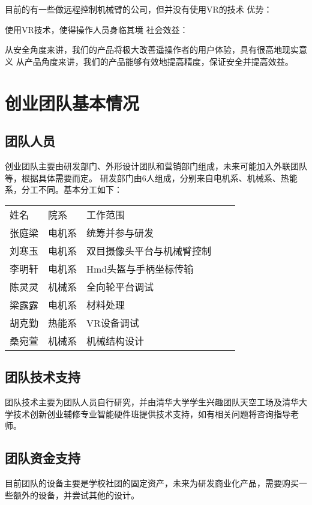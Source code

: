 目前的有一些做远程控制机械臂的公司，但并没有使用VR的技术
\newline
优势：

使用VR技术，使得操作人员身临其境
\newline
社会效益：

从安全角度来讲，我们的产品将极大改善遥操作者的用户体验，具有很高地现实意义
从产品角度来讲，我们的产品能够有效地提高精度，保证安全并提高效益。


\chapter{创业团队基本情况}

\section{团队人员}

创业团队主要由研发部门、外形设计团队和营销部门组成，未来可能加入外联团队等，根据具体需要而定。
研发部门由6人组成，分别来自电机系、机械系、热能系，分工不同。基本分工如下：
\begin{table}[H]
\begin{tabular}{lllll}
姓名&	院系&	工作范围\\
张庭梁&	电机系&	统筹并参与研发\\
刘寒玉&	电机系&	双目摄像头平台与机械臂控制\\
李明轩&	电机系&	Hmd头盔与手柄坐标传输\\
陈灵灵&	机械系&	全向轮平台调试\\
梁露露&	电机系&	材料处理\\
胡克勤&	热能系&	VR设备调试\\
桑宛萱&	机械系&	机械结构设计\\
\end{tabular}
\end{table}

\section{团队技术支持}
团队技术主要为团队人员自行研究，并由清华大学学生兴趣团队天空工场及清华大学技术创新创业辅修专业智能硬件班提供技术支持，如有相关问题将咨询指导老师。

\section{团队资金支持}
目前团队的设备主要是学校社团的固定资产，未来为研发商业化产品，需要购买一些额外的设备，并尝试其他的设计。


